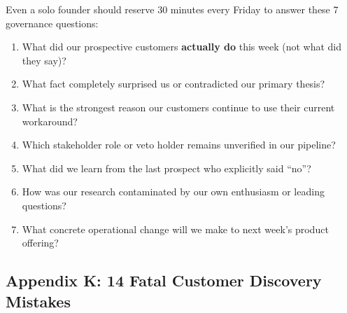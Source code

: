 Even a solo founder should reserve 30 minutes every Friday to answer these 7 governance questions:
\begin{enumerate}[leftmargin=1.2em,itemsep=0.2ex]
  \item What did our prospective customers \textbf{actually do} this week (not what did they say)?
  \item What fact completely surprised us or contradicted our primary thesis?
  \item What is the strongest reason our customers continue to use their current workaround?
  \item Which stakeholder role or veto holder remains unverified in our pipeline?
  \item What did we learn from the last prospect who explicitly said ``no''?
  \item How was our research contaminated by our own enthusiasm or leading questions?
  \item What concrete operational change will we make to next week's product offering?
\end{enumerate}

\subsection*{Appendix K: 14 Fatal Customer Discovery Mistakes}

